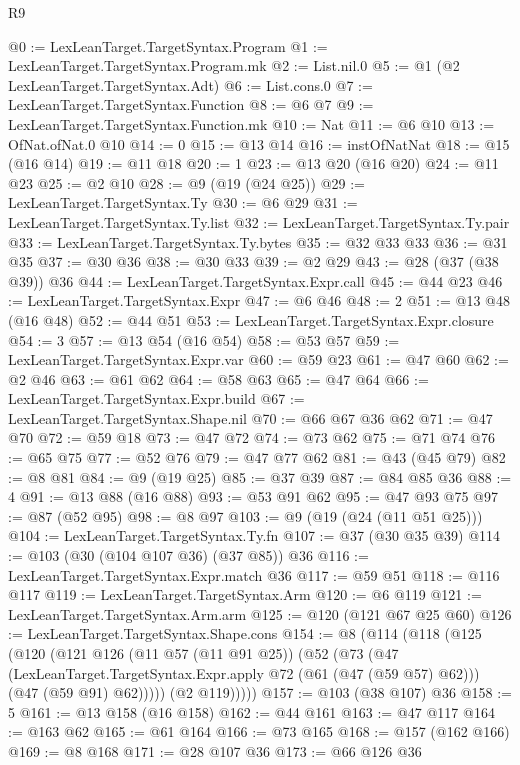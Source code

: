 \begin{lexlean}{R9}
\begin{coremodule}
@0 := LexLeanTarget.TargetSyntax.Program
@1 := LexLeanTarget.TargetSyntax.Program.mk
@2 := List.nil.{0}
@5 := @1 (@2 LexLeanTarget.TargetSyntax.Adt)
@6 := List.cons.{0}
@7 := LexLeanTarget.TargetSyntax.Function
@8 := @6 @7
@9 := LexLeanTarget.TargetSyntax.Function.mk
@10 := Nat
@11 := @6 @10
@13 := OfNat.ofNat.{0} @10
@14 := 0
@15 := @13 @14
@16 := instOfNatNat
@18 := @15 (@16 @14)
@19 := @11 @18
@20 := 1
@23 := @13 @20 (@16 @20)
@24 := @11 @23
@25 := @2 @10
@28 := @9 (@19 (@24 @25))
@29 := LexLeanTarget.TargetSyntax.Ty
@30 := @6 @29
@31 := LexLeanTarget.TargetSyntax.Ty.list
@32 := LexLeanTarget.TargetSyntax.Ty.pair
@33 := LexLeanTarget.TargetSyntax.Ty.bytes
@35 := @32 @33 @33
@36 := @31 @35
@37 := @30 @36
@38 := @30 @33
@39 := @2 @29
@43 := @28 (@37 (@38 @39)) @36
@44 := LexLeanTarget.TargetSyntax.Expr.call
@45 := @44 @23
@46 := LexLeanTarget.TargetSyntax.Expr
@47 := @6 @46
@48 := 2
@51 := @13 @48 (@16 @48)
@52 := @44 @51
@53 := LexLeanTarget.TargetSyntax.Expr.closure
@54 := 3
@57 := @13 @54 (@16 @54)
@58 := @53 @57
@59 := LexLeanTarget.TargetSyntax.Expr.var
@60 := @59 @23
@61 := @47 @60
@62 := @2 @46
@63 := @61 @62
@64 := @58 @63
@65 := @47 @64
@66 := LexLeanTarget.TargetSyntax.Expr.build
@67 := LexLeanTarget.TargetSyntax.Shape.nil
@70 := @66 @67 @36 @62
@71 := @47 @70
@72 := @59 @18
@73 := @47 @72
@74 := @73 @62
@75 := @71 @74
@76 := @65 @75
@77 := @52 @76
@79 := @47 @77 @62
@81 := @43 (@45 @79)
@82 := @8 @81
@84 := @9 (@19 @25)
@85 := @37 @39
@87 := @84 @85 @36
@88 := 4
@91 := @13 @88 (@16 @88)
@93 := @53 @91 @62
@95 := @47 @93 @75
@97 := @87 (@52 @95)
@98 := @8 @97
@103 := @9 (@19 (@24 (@11 @51 @25)))
@104 := LexLeanTarget.TargetSyntax.Ty.fn
@107 := @37 (@30 @35 @39)
@114 := @103 (@30 (@104 @107 @36) (@37 @85)) @36
@116 := LexLeanTarget.TargetSyntax.Expr.match @36
@117 := @59 @51
@118 := @116 @117
@119 := LexLeanTarget.TargetSyntax.Arm
@120 := @6 @119
@121 := LexLeanTarget.TargetSyntax.Arm.arm
@125 := @120 (@121 @67 @25 @60)
@126 := LexLeanTarget.TargetSyntax.Shape.cons
@154 := @8
    (@114
      (@118
        (@125
          (@120
            (@121
              @126
              (@11 @57 (@11 @91 @25))
              (@52
                (@73
                  (@47
                    (LexLeanTarget.TargetSyntax.Expr.apply @72 (@61 (@47 (@59 @57) @62)))
                    (@47 (@59 @91) @62)))))
            (@2 @119)))))
@157 := @103 (@38 @107) @36
@158 := 5
@161 := @13 @158 (@16 @158)
@162 := @44 @161
@163 := @47 @117
@164 := @163 @62
@165 := @61 @164
@166 := @73 @165
@168 := @157 (@162 @166)
@169 := @8 @168
@171 := @28 @107 @36
@173 := @66 @126 @36

\end{coremodule}
\end{lexlean}
